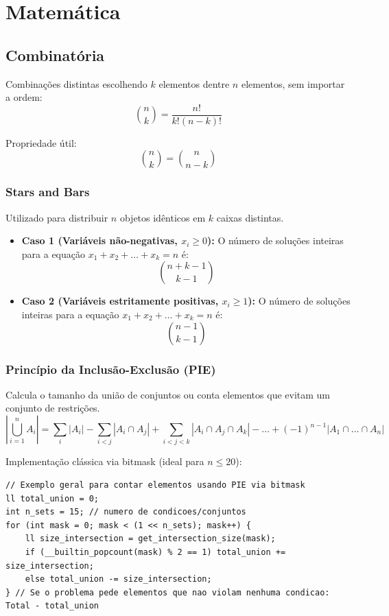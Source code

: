\section{Matemática}



\subsection{Combinatória}

Combinações distintas escolhendo $k$ elementos dentre $n$ elementos, sem importar a ordem:
\[
\binom{n}{k}
=
\frac{n!}{k!(n-k)!}
\]

Propriedade útil:
\[
\binom{n}{k}
=
\binom{n}{n-k}
\]

\subsubsection{Stars and Bars}
Utilizado para distribuir $n$ objetos idênticos em $k$ caixas distintas.

\begin{itemize}
    \item \textbf{Caso 1 (Variáveis não-negativas, $x_i \ge 0$):}
    O número de soluções inteiras para a equação $x_1 + x_2 + \dots + x_k = n$ é:
    \[
    \binom{n + k - 1}{k - 1}
    \]
    \item \textbf{Caso 2 (Variáveis estritamente positivas, $x_i \ge 1$):}
    O número de soluções inteiras para a equação $x_1 + x_2 + \dots + x_k = n$ é:
    \[
    \binom{n - 1}{k - 1}
    \]
\end{itemize}

\subsubsection{Princípio da Inclusão-Exclusão (PIE)}
Calcula o tamanho da união de conjuntos ou conta elementos que evitam um conjunto de restrições.
\[
\left| \bigcup_{i=1}^{n} A_i \right| = \sum_{i} |A_i| - \sum_{i < j} |A_i \cap A_j| + \sum_{i < j < k} |A_i \cap A_j \cap A_k| - \dots + (-1)^{n-1} |A_1 \cap \dots \cap A_n|
\]

Implementação clássica via bitmask (ideal para $n \le 20$):
\begin{lstlisting}
// Exemplo geral para contar elementos usando PIE via bitmask
ll total_union = 0;
int n_sets = 15; // numero de condicoes/conjuntos
for (int mask = 0; mask < (1 << n_sets); mask++) {
    ll size_intersection = get_intersection_size(mask);
    if (__builtin_popcount(mask) % 2 == 1) total_union += size_intersection;
    else total_union -= size_intersection;
} // Se o problema pede elementos que nao violam nenhuma condicao: Total - total_union
\end{lstlisting}



